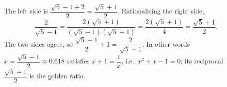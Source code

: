 The left side is $\dfrac{\sqrt5-1+2}{2}=\dfrac{\sqrt5+1}{2}$. Rationalising the right side,
\[
\dfrac{2}{\sqrt5-1}=\dfrac{2(\sqrt5+1)}{(\sqrt5-1)(\sqrt5+1)}=\dfrac{2(\sqrt5+1)}{4}=\dfrac{\sqrt5+1}{2}.
\]
The two sides agree, so $\boxed{\dfrac{\sqrt5-1}{2}+1=\dfrac{2}{\sqrt5-1}}$. In other words $x=\dfrac{\sqrt5-1}{2}\approx0.618$ satisfies $x+1=\dfrac{1}{x}$, i.e.\ $x^2+x-1=0$; its reciprocal $\dfrac{\sqrt5+1}{2}$ is the golden ratio.
